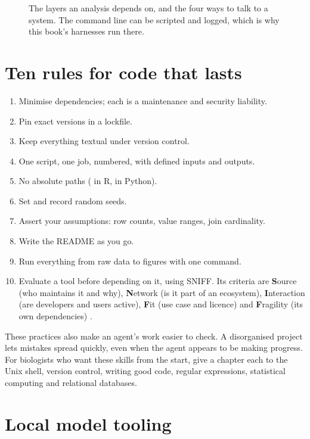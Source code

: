 \begin{figure}[htbp]
\centering
{}
\caption{The layers an analysis depends on, and the four ways to talk to a
system. The command line can be scripted and logged, which is why this book's
harnesses run there.}
\label{fig:layers}
\end{figure}

\section{Ten rules for code that lasts}

\begin{enumerate}
  \item Minimise dependencies; each is a maintenance and security liability.
  \item Pin exact versions in a lockfile.
  \item Keep everything textual under version control.
  \item One script, one job, numbered, with defined inputs and outputs.
  \item No absolute paths ( in R,  in Python).
  \item Set and record random seeds.
  \item Assert your assumptions: row counts, value ranges, join cardinality.
  \item Write the README as you go.
  \item Run everything from raw data to figures with one command.
  \item Evaluate a tool before depending on it, using SNIFF. Its criteria are \textbf{S}ource
    (who maintains it and why), \textbf{N}etwork (is it part of an ecosystem),
    \textbf{I}nteraction (are developers and users active), \textbf{F}it (use
    case and licence) and \textbf{F}ragility (its own dependencies)
    \parencite{nagraj2026sniff}.
\end{enumerate}

These practices also make an agent's work easier to check. A disorganised
project lets mistakes spread quickly, even when the agent appears to be
making progress. For biologists who want these skills from the start,
\textcite{allesina2019computing} give a chapter each to the Unix shell,
version control, writing good code, regular expressions, statistical
computing and relational databases.

\section{Local model tooling}

